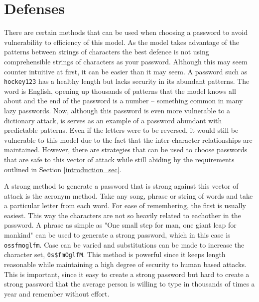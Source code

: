 \documentclass[11pt]{article}
\begin{document}
\section{Defenses} \label{defenses_sec}
There are certain methods that can be used when choosing a password to avoid vulnerability to efficiency of this model. As the model takes advantage of the patterns between strings of characters the best defence is not using comprehensible strings of characters as your password. Although this may seem counter intuitive at first, it can be easier than it may seem. A password such as \texttt{hockey123} has a healthy length but lacks security in its abundant patterns. The word is English, opening up thousands of patterns that the model knows all about and the end of the password is a number -- something common in many lazy passwords. Now, although this password is even more vulnerable to a dictionary attack, is serves as an example of a password abundant with predictable patterns. Even if the letters were to be reversed, it would still be vulnerable to this model due to the fact that the inter-character relationships are maintained. However, there are strategies that can be used to choose passwords that are safe to this vector of attack while still abiding by the requirements outlined in Section \ref{introduction_sec}.

A strong method to generate a password that is strong against this vector of attack is the acronym method. Take any song, phrase or string of words and take a particular letter from each word. For ease of remembering, the first is usually easiest. This way the characters are not so heavily related to eachother in the password. A phrase as simple as "One small step for man, one giant leap for mankind" can be used to generate a strong password, which in this case is \texttt{ossfmoglfm}. Case can be varied and substitutions can be made to increase the character set, \texttt{0s\$fmOglfM}. This method is powerful since it keeps length reasonable while maintaining a high degree of security to human based attacks. This is important, since it easy to create a strong password but hard to create a strong password that the average person is willing to type in thousands of times a year and remember without effort.

\pagebreak
\printbibliography
\end{document}
